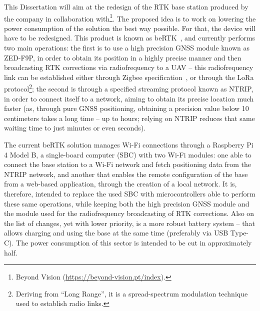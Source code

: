 This Dissertation will aim at the redesign of the RTK base station produced by the company in collaboration with\footnote{Beyond Vision (\url{https://beyond-vision.pt/index}).}. The proposed idea is to work on lowering the power consumption of the solution the best way possible. For that, the device will have to be redesigned. This product is known as beRTK\textsuperscript{\textregistered}~\cite{beRTK_2022}, and currently performs two main operations: the first is to use a high precision GNSS module known as ZED-F9P, in order to obtain its position in a highly precise manner and then broadcasting RTK corrections via radiofrequency to a UAV -- this radiofrequency link can be established either through Zigbee specification~\cite{ZigBee_2008}, or through the LoRa protocol\footnote{Deriving from ``Long Range'', it is a spread-spectrum modulation technique used to establish radio links.};
the second is through a specified streaming protocol known as \gls{NTRIP}, in order to connect itself to a network, aiming to obtain its precise location much faster (as, through pure GNSS positioning, obtaining a precision value below 10 centimeters takes a long time -- up to hours; relying on NTRIP reduces that same waiting time to just minutes or even seconds).

The current beRTK\textsuperscript{\textregistered} solution manages Wi-Fi connections through a Raspberry Pi 4 Model B, a single-board computer (SBC) with two Wi-Fi modules:
one able to connect the base station to a Wi-Fi network and fetch positioning data from the NTRIP network, and another that enables the remote configuration of the base from a web-based application, through the creation of a local network.
It is, therefore, intended to replace the used SBC with microcontrollers able to perform these same operations, while keeping both the high precision GNSS module and the module used for the radiofrequency broadcasting of RTK corrections.
Also on the list of changes, yet with lower priority, is a more robust battery system -- that allows charging and using the base at the same time (preferably via USB Type-C). The power consumption of this sector is intended to be cut in approximately half.
